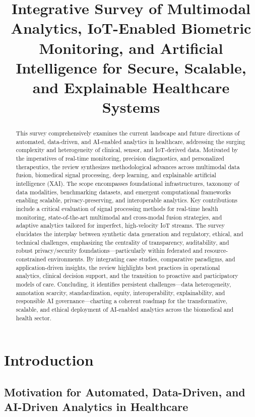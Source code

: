 \documentclass[sigconf]{acmart}
\title{Integrative Survey of Multimodal Analytics, IoT-Enabled Biometric Monitoring, and Artificial Intelligence for Secure, Scalable, and Explainable Healthcare Systems}
\begin{document}
\begin{abstract}
This survey comprehensively examines the current landscape and future directions of automated, data-driven, and AI-enabled analytics in healthcare, addressing the surging complexity and heterogeneity of clinical, sensor, and IoT-derived data. Motivated by the imperatives of real-time monitoring, precision diagnostics, and personalized therapeutics, the review synthesizes methodological advances across multimodal data fusion, biomedical signal processing, deep learning, and explainable artificial intelligence (XAI). The scope encompasses foundational infrastructures, taxonomy of data modalities, benchmarking datasets, and emergent computational frameworks enabling scalable, privacy-preserving, and interoperable analytics. Key contributions include a critical evaluation of signal processing methods for real-time health monitoring, state-of-the-art multimodal and cross-modal fusion strategies, and adaptive analytics tailored for imperfect, high-velocity IoT streams. The survey elucidates the interplay between synthetic data generation and regulatory, ethical, and technical challenges, emphasizing the centrality of transparency, auditability, and robust privacy/security foundations—particularly within federated and resource-constrained environments. By integrating case studies, comparative paradigms, and application-driven insights, the review highlights best practices in operational analytics, clinical decision support, and the transition to proactive and participatory models of care. Concluding, it identifies persistent challenges—data heterogeneity, annotation scarcity, standardization, equity, interoperability, explainability, and responsible AI governance—charting a coherent roadmap for the transformative, scalable, and ethical deployment of AI-enabled analytics across the biomedical and health sector.
\end{abstract}

\maketitle

\section{Introduction}

\subsection{Motivation for Automated, Data-Driven, and AI-Driven Analytics in Healthcare}
\end{document}
